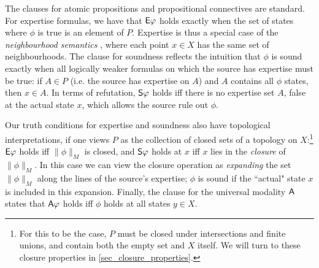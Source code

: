 The clauses for atomic propositions and propositional
connectives are standard. For expertise formulas, we have that $\E\phi$
holds exactly when the set of states where $\phi$ is true is an element
of $P$. Expertise is thus a special case of the \emph{neighbourhood semantics}
\citep{pacuit2017neighborhood}, where each point $x \in X$ has the same
set of neighbourhoods. The clause for soundness reflects the intuition that
$\phi$ is sound exactly when all logically weaker formulas on which the
source has expertise must be true: if $A \in P$ (i.e. the source has
expertise on $A$) and $A$ contains all $\phi$ states, then
$x \in A$. In terms of refutation, $\S\phi$ holds iff there is no
expertise set $A$, false at the actual state $x$, which allows the
source rule out $\phi$.

Our truth conditions for expertise and soundness also have topological
interpretations, if one views $P$ as the collection of closed sets of a
topology on $X$:\footnote{For this to be the case, $P$ must be closed under
intersections and finite unions, and contain both the empty set and $X$ itself.
We will turn to these closure properties in \cref{sec_closure_properties}.} $\E\phi$ holds
iff $\|\phi\|_M$ is closed, and $\S\phi$ holds at $x$ iff $x$ lies in the
\emph{closure} of $\|\phi\|_M$.\footnotemark{} In this case we can view the
closure operation as \emph{expanding} the set $\|\phi\|_M$ along the lines of
the source's expertise; $\phi$ is sound if the ``actual" state $x$ is included
in this expansion.
%
Finally, the clause for the universal modality $\A$ states that $\A\phi$ holds
iff $\phi$ holds at all states $y \in X$.


\def\w{1}
\def\h{0.4}
\newcommand{\examplemodel}{
    \tikzset{mynode/.style={color=black}}
    \node[mynode] (a) at (0, 0) {$ipd$};
    \node[mynode] (b) at (\w, 0) {$pd$};
    \node[mynode] (c) at (0, \h) {$ip$};
    \node[mynode] (d) at (\w, \h) {$p$};
    \node[mynode] (e) at (0, 2*\h) {$id$};
    \node[mynode] (f) at (\w, 2*\h) {$d$};
    \node[mynode] (g) at (0, 3*\h) {$i$};
    \node[mynode] (h) at (\w, 3*\h) {$\emptyset$};
}


